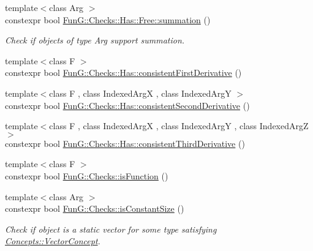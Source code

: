 \begin{DoxyCompactItemize}
{\footnotesize template$<$class Arg $>$ }\\constexpr bool \hyperlink{namespaceFunG_1_1Checks_1_1Has_1_1Free_a1cf46f7335354d21dff506aaf812b4f5}{Fun\-G\-::\-Checks\-::\-Has\-::\-Free\-::summation} ()
\begin{DoxyCompactList}\small\item\em Check if objects of type Arg support summation. \end{DoxyCompactList}\item 
{\footnotesize template$<$class F $>$ }\\constexpr bool \hyperlink{namespaceFunG_1_1Checks_1_1Has_a3c61b3f75ad634464322f21e8acb4e5d}{Fun\-G\-::\-Checks\-::\-Has\-::consistent\-First\-Derivative} ()
\item 
{\footnotesize template$<$class F , class Indexed\-Arg\-X , class Indexed\-Arg\-Y $>$ }\\constexpr bool \hyperlink{namespaceFunG_1_1Checks_1_1Has_ab4a78fd7a1175707d748445785a0d37c}{Fun\-G\-::\-Checks\-::\-Has\-::consistent\-Second\-Derivative} ()
\item 
{\footnotesize template$<$class F , class Indexed\-Arg\-X , class Indexed\-Arg\-Y , class Indexed\-Arg\-Z $>$ }\\constexpr bool \hyperlink{namespaceFunG_1_1Checks_1_1Has_abf6a73e1b599a4aac525bb20931aea4f}{Fun\-G\-::\-Checks\-::\-Has\-::consistent\-Third\-Derivative} ()
\item 
{\footnotesize template$<$class F $>$ }\\constexpr bool \hyperlink{group__ConceptGroup_gac6e6c5574a8497cc0749e5a613e4d57c}{Fun\-G\-::\-Checks\-::is\-Function} ()
\item 
{\footnotesize template$<$class Arg $>$ }\\constexpr bool \hyperlink{group__ConceptGroup_gadcc3e179af2ed0384a3773ea086045b9}{Fun\-G\-::\-Checks\-::is\-Constant\-Size} ()
\begin{DoxyCompactList}\small\item\em Check if object is a static vector for some type satisfying \hyperlink{structFunG_1_1Concepts_1_1VectorConcept}{Concepts\-::\-Vector\-Concept}. \end{DoxyCompactList}\end{DoxyCompactItemize}
